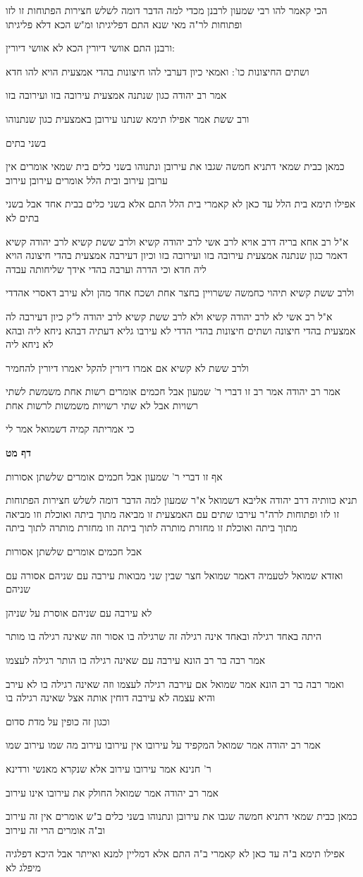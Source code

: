 \documentclass[12pt, openany]{book}
\newcommand{\sethebfont}{
\fontsize{10.5pt}{21.0pt} \selectfont
}
\newcommand{\textblock}[1]{
{\sethebfont #1\\}	
}
\newcommand{\sectname}{}
\newcommand{\newsection}[1]{
	\addcontentsline{toc}{section}{#1}
	\renewcommand{\sectname}{#1}	
	\vspace{-\baselineskip}
	\begin{center}
		\textbf{%
\fontsize{16pt}{16pt}\selectfont
			#1}
	\end{center}
	\vspace{-\baselineskip}
	\nopagebreak
}
\begin{document}
\textblock{הכי קאמר להו רבי שמעון לרבנן מכדי למה הדבר דומה לשלש חצירות הפתוחות זו לזו ופתוחות לר"ה מאי שנא התם דפליגיתו ומ"ש הכא דלא פליגיתו}
\textblock{ורבנן התם אוושי דיורין הכא לא אוושי דיורין:}
\textblock{ושתים החיצונות כו': ואמאי כיון דערבי להו חיצונות בהדי אמצעית הויא להו חדא}
\textblock{אמר רב יהודה כגון שנתנה אמצעית עירובה בזו ועירובה בזו}
\textblock{ורב ששת אמר אפילו תימא שנתנו עירובן באמצעית כגון שנתנוהו}
\textblock{בשני בתים}
\textblock{כמאן כבית שמאי דתניא חמשה שגבו את עירובן ונתנוהו בשני כלים בית שמאי אומרים אין ערובן עירוב ובית הלל אומרים עירובן עירוב}
\textblock{אפילו תימא בית הלל עד כאן לא קאמרי בית הלל התם אלא בשני כלים בבית אחד אבל בשני בתים לא}
\textblock{א"ל רב אחא בריה דרב אויא לרב אשי לרב יהודה קשיא ולרב ששת קשיא לרב יהודה קשיא דאמר כגון שנתנה אמצעית עירובה בזו ועירובה בזו וכיון דעירבה אמצעית בהדי חיצונה הויא ליה חדא וכי הדרה וערבה בהדי אידך שליחותה עבדה}
\textblock{ולרב ששת קשיא תיהוי כחמשה ששרויין בחצר אחת ושכח אחד מהן ולא עירב דאסרי אהדדי}
\textblock{א"ל רב אשי לא לרב יהודה קשיא ולא לרב ששת קשיא לרב יהודה ל"ק כיון דעירבה לה אמצעית בהדי חיצונה ושתים חיצונות בהדי הדדי לא עירבו גליא דעתיה דבהא ניחא ליה ובהא לא ניחא ליה}
\textblock{ולרב ששת לא קשיא אם אמרו דיורין להקל יאמרו דיורין להחמיר}
\textblock{אמר רב יהודה אמר רב זו דברי ר' שמעון אבל חכמים אומרים רשות אחת משמשת לשתי רשויות אבל לא שתי רשויות משמשות לרשות אחת}
\textblock{כי אמריתה קמיה דשמואל אמר לי}
\newsection{דף מט}
\textblock{אף זו דברי ר' שמעון אבל חכמים אומרים שלשתן אסורות}
\textblock{תניא כוותיה דרב יהודה אליבא דשמואל א"ר שמעון למה הדבר דומה לשלש חצירות הפתוחות זו לזו ופתוחות לרה"ר עירבו שתים עם האמצעית זו מביאה מתוך ביתה ואוכלת וזו מביאה מתוך ביתה ואוכלת זו מחזרת מותרה לתוך ביתה וזו מחזרת מותרה לתוך ביתה}
\textblock{אבל חכמים אומרים שלשתן אסורות}
\textblock{ואזדא שמואל לטעמיה דאמר שמואל חצר שבין שני מבואות עירבה עם שניהם אסורה עם שניהם}
\textblock{לא עירבה עם שניהם אוסרת על שניהן}
\textblock{היתה באחד רגילה ובאחד אינה רגילה זה שרגילה בו אסור וזה שאינה רגילה בו מותר}
\textblock{אמר רבה בר רב הונא עירבה עם שאינה רגילה בו הותר רגילה לעצמו}
\textblock{ואמר רבה בר רב הונא אמר שמואל אם עירבה רגילה לעצמו וזה שאינה רגילה בו לא עירב והיא עצמה לא עירבה דוחין אותה אצל שאינה רגילה בו}
\textblock{וכגון זה כופין על מדת סדום}
\textblock{אמר רב יהודה אמר שמואל המקפיד על עירובו אין עירובו עירוב מה שמו עירוב שמו}
\textblock{ר' חנינא אמר עירובו עירוב אלא שנקרא מאנשי ורדינא}
\textblock{אמר רב יהודה אמר שמואל החולק את עירובו אינו עירוב}
\textblock{כמאן כבית שמאי דתניא חמשה שגבו את עירובן ונתנוהו בשני כלים ב"ש אומרים אין זה עירוב וב"ה אומרים הרי זה עירוב}
\textblock{אפילו תימא ב"ה עד כאן לא קאמרי ב"ה התם אלא דמליין למנא ואייתר אבל היכא דפלגיה מיפלג לא}
\end{document}
